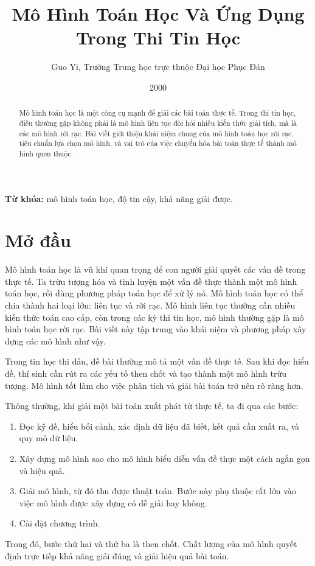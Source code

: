 \documentclass[11pt]{article}
\title{Mô Hình Toán Học Và Ứng Dụng Trong Thi Tin Học}
\author{Guo Yi, Trường Trung học trực thuộc Đại học Phục Đán}
\date{2000}
\begin{document}
\maketitle


\begin{abstract}
Mô hình toán học là một công cụ mạnh để giải các bài toán thực tế. Trong thi
tin học, điều thường gặp không phải là mô hình liên tục đòi hỏi nhiều kiến
thức giải tích, mà là các mô hình rời rạc. Bài viết giới thiệu khái niệm chung
của mô hình toán học rời rạc, tiêu chuẩn lựa chọn mô hình, và vai trò của việc
chuyển hóa bài toán thực tế thành mô hình quen thuộc.
\end{abstract}

\noindent\textbf{Từ khóa:} mô hình toán học, độ tin cậy, khả năng giải được.

\section{Mở đầu}

Mô hình toán học là vũ khí quan trọng để con người giải quyết các vấn đề trong
thực tế. Ta trừu tượng hóa và tinh luyện một vấn đề thực thành một mô hình
toán học, rồi dùng phương pháp toán học để xử lý nó. Mô hình toán học có thể
chia thành hai loại lớn: liên tục và rời rạc. Mô hình liên tục thường cần
nhiều kiến thức toán cao cấp, còn trong các kỳ thi tin học, mô hình thường gặp
là mô hình toán học rời rạc. Bài viết này tập trung vào khái niệm và phương
pháp xây dựng các mô hình như vậy.

Trong tin học thi đấu, đề bài thường mô tả một vấn đề thực tế. Sau khi đọc
hiểu đề, thí sinh cần rút ra các yếu tố then chốt và tạo thành một mô hình
trừu tượng. Mô hình tốt làm cho việc phân tích và giải bài toán trở nên rõ
ràng hơn.

Thông thường, khi giải một bài toán xuất phát từ thực tế, ta đi qua các bước:
\begin{enumerate}
  \item Đọc kỹ đề, hiểu bối cảnh, xác định dữ liệu đã biết, kết quả cần xuất
  ra, và quy mô dữ liệu.
  \item Xây dựng mô hình sao cho mô hình biểu diễn vấn đề thực một cách ngắn
  gọn và hiệu quả.
  \item Giải mô hình, từ đó thu được thuật toán. Bước này phụ thuộc rất lớn
  vào việc mô hình được xây dựng có dễ giải hay không.
  \item Cài đặt chương trình.
\end{enumerate}
Trong đó, bước thứ hai và thứ ba là then chốt. Chất lượng của mô hình quyết
định trực tiếp khả năng giải đúng và giải hiệu quả bài toán.
\end{document}
